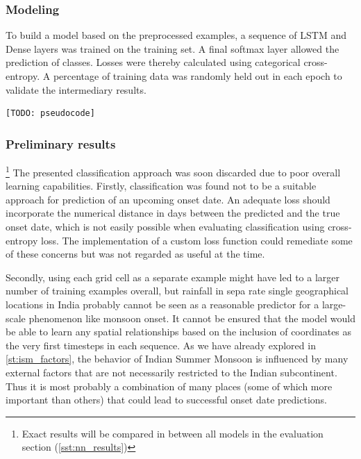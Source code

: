 \subsubsection{Modeling}
\label{ssst:nn_t2_model}
To build a model based on the preprocessed examples, a sequence of LSTM and Dense layers was trained on the training set. A final softmax layer allowed the prediction of classes. Losses were thereby calculated using categorical cross-entropy. A percentage of training data was randomly held out in each epoch to validate the intermediary results.

\begin{figure}[h]
\end{figure}

\begin{lstlisting}[language=Python]
  [TODO: pseudocode]
\end{lstlisting}

\subsubsection{Preliminary results}{\footnote{Exact results will be compared in between all models in the evaluation section (\cref{sst:nn_results})}}
\label{ssst:nn_t2_results}
The presented classification approach was soon discarded due to poor overall learning capabilities. Firstly, classification was found not to be a suitable approach for prediction of an upcoming onset date. An adequate loss should incorporate the numerical distance in days between the predicted and the true onset date, which is not easily possible when evaluating classification using cross-entropy loss. The implementation of a custom loss function could remediate some of these concerns but was not regarded as useful at the time.

Secondly, using each grid cell as a separate example might have led to a larger number of training examples overall, but rainfall in sepa rate single geographical locations in India probably cannot be seen as a reasonable predictor for a large-scale phenomenon like monsoon onset. It cannot be ensured that the model would be able to learn any spatial relationships based on the inclusion of coordinates as the very first timesteps in each sequence. As we have already explored in \cref{st:ism_factors}, the behavior of Indian Summer Monsoon is influenced by many external factors that are not necessarily restricted to the Indian subcontinent. Thus it is most probably a combination of many places (some of which more important than others) that could lead to successful onset date predictions.


